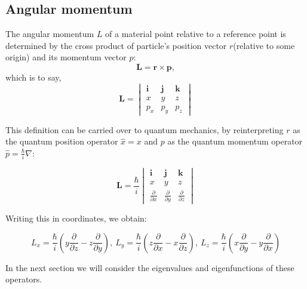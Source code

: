 \documentclass[a4paper, 12pt]{article}
\begin{document}
\subsection{Angular momentum}
The angular momentum $L$ of a material point relative to a reference point is determined by the cross product of particle's position vector $r$(relative to some origin) and its momentum vector $p$:
$$\mathbf{L = r \times  p},$$
which is to say,
$$\boldsymbol{L} = \begin{vmatrix} \boldsymbol{i} & \boldsymbol{j} & \boldsymbol{k} \\ 
x & y & z \\
p_x & p_y & p_z
\end{vmatrix}$$


This definition can be carried over to quantum mechanics, by reinterpreting $r$ as the quantum position operator   $\hat x=x$  and $p$ as the quantum momentum operator $\hat p=\frac{\hbar}{i}\nabla$:


$$\boldsymbol{L} = \frac{\hbar}{i}\begin{vmatrix} \boldsymbol{i} & \boldsymbol{j} & \boldsymbol{k} \\ 
x & y & z \\
\frac{\partial}{\partial x} & \frac{\partial}{\partial y} & \frac{\partial}{\partial z}
\end{vmatrix}$$

Writing this in coordinates, we obtain:

$$L_x = \frac{\hbar}{i}(y \frac{\partial}{\partial z}-z \frac{\partial}{\partial y}), ~L_y = \frac{\hbar}{i}(z \frac{\partial}{\partial x}-x \frac{\partial}{\partial z}), ~L_z = \frac{\hbar}{i}(x \frac{\partial}{\partial y}-y \frac{\partial}{\partial x})$$


In the next section we will consider the eigenvalues and eigenfunctions of these operators.
\end{document}
